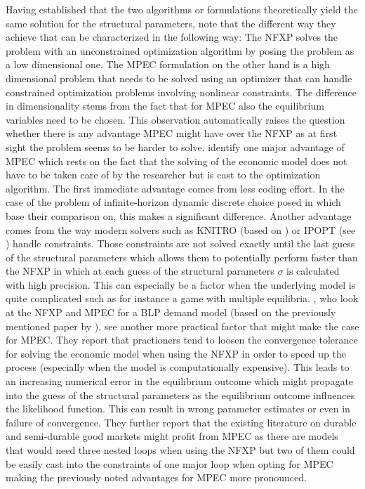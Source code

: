 Having established that the two algorithms or formulations theoretically yield the same solution for the structural parameters, \cite{Dong.Hsieh.Zhang.2017} note that the different way they achieve that can be characterized in the following way: The NFXP solves the problem with an unconstrained optimization algorithm by posing the problem as a low dimensional one. The MPEC formulation on the other hand is a high dimensional problem that needs to be solved using an optimizer that can handle constrained optimization problems involving nonlinear constraints. The difference in dimensionality stems from the fact that for MPEC also the equilibrium variables need to be chosen. This observation automatically raises the question whether there is any advantage MPEC might have over the NFXP as at first sight the problem seems to be harder to solve. \cite{Su.Judd.2012} identify one major advantage of MPEC which rests on the fact that the solving of the economic model does not have to be taken care of by the researcher but is cast to the optimization algorithm. The first immediate advantage comes from less coding effort. In the case of the problem of infinite-horizon dynamic discrete choice posed in \cite{Rust.1987} which \citeauthor{Su.Judd.2012} base their comparison on, this makes a significant difference. Another advantage comes from the way modern solvers such as KNITRO (based on \cite{Byrd.Nocedal.Waltz.2006}) or IPOPT (see \cite{Pirnay.Lopez-Negrete.Biegler.2011}) handle constraints. Those constraints are not solved exactly until the last guess of the structural parameters which allows them to potentially perform faster than the NFXP in which at each guess of the structural parameters $\sigma$ is calculated with high precision. This can especially be a factor when the underlying model is quite complicated such as for instance a game with multiple equilibria. \cite{Dube.Fox.Su.2012}, who look at the NFXP and MPEC for a BLP demand model (based on the previously mentioned paper by \cite{Berry.1995}), see another more practical factor that might make the case for MPEC. They report that practioners tend to loosen the convergence tolerance for solving the economic model when using the NFXP in order to speed up the process (especially when the model is computationally expensive). This leads to an increasing numerical error in the equilibrium outcome which might propagate into the guess of the structural parameters as the equilibrium outcome influences the likelihood function. This can result in wrong parameter estimates or even in failure of convergence. They further report that the existing literature on durable and semi-durable good markets might profit from MPEC as there are models that would need three nested loops when using the NFXP but two of them could be easily cast into the constraints of one major loop when opting for MPEC making the previously noted advantages for MPEC more pronounced.

